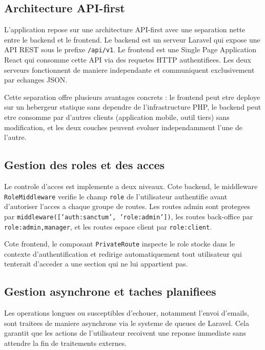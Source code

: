 \subsection{Architecture API-first}

L'application repose sur une architecture API-first avec une separation
nette entre le backend et le frontend. Le backend est un serveur Laravel
qui expose une API REST sous le prefixe \texttt{/api/v1}. Le frontend
est une Single Page Application React qui consomme cette API via des
requetes HTTP authentifiees. Les deux serveurs fonctionnent de maniere
independante et communiquent exclusivement par echanges JSON.

Cette separation offre plusieurs avantages concrets : le frontend peut
etre deploye sur un hebergeur statique sans dependre de l'infrastructure
PHP, le backend peut etre consomme par d'autres clients (application
mobile, outil tiers) sans modification, et les deux couches peuvent
evoluer independamment l'une de l'autre.

\subsection{Gestion des roles et des acces}

Le controle d'acces est implemente a deux niveaux. Cote backend, le
middleware \texttt{RoleMiddleware} verifie le champ \texttt{role} de
l'utilisateur authentifie avant d'autoriser l'acces a chaque groupe
de routes. Les routes admin sont protegees par
\texttt{middleware(['auth:sanctum', 'role:admin'])},  les routes
back-office par \\ \texttt{role:admin,manager}, 
et les routes espace
client par \texttt{role:client}.

Cote frontend, le composant \texttt{PrivateRoute} inspecte le role
stocke dans le contexte d'authentification et redirige automatiquement
tout utilisateur qui tenterait d'acceder a une section qui ne lui
appartient pas.

\subsection{Gestion asynchrone et taches planifiees}

Les operations longues ou susceptibles d'echouer, notamment l'envoi
d'emails, sont traitees de maniere asynchrone via le systeme de queues
de Laravel. Cela garantit que les actions de l'utilisateur recoivent
une reponse immediate sans attendre la fin de traitements externes.

